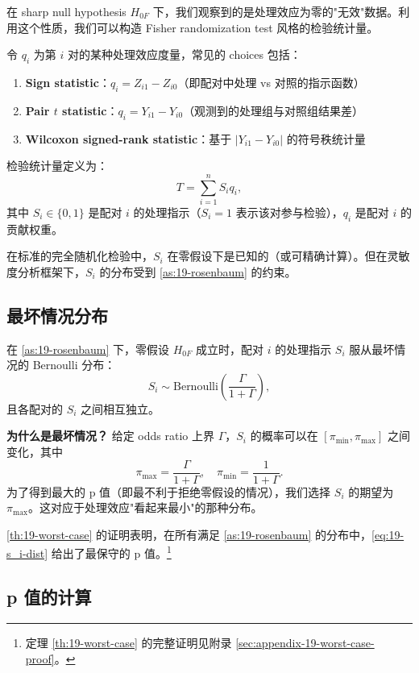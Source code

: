 在 sharp null hypothesis $H_{0F}$ 下，我们观察到的是处理效应为零的"无效"数据。利用这个性质，我们可以构造 Fisher randomization test 风格的检验统计量。

令 $q_i$ 为第 $i$ 对的某种处理效应度量，常见的 choices 包括：

\begin{enumerate}
  \item \textbf{Sign statistic}：$q_i = Z_{i1} - Z_{i0}$（即配对中处理 vs 对照的指示函数）
  \item \textbf{Pair $t$ statistic}：$q_i = Y_{i1} - Y_{i0}$（观测到的处理组与对照组结果差）
  \item \textbf{Wilcoxon signed-rank statistic}：基于 $|Y_{i1} - Y_{i0}|$ 的符号秩统计量
\end{enumerate}

检验统计量定义为：
\[
T = \sum_{i=1}^n S_i q_i,
\label{eq:19-test-stat}
\]
其中 $S_i \in \{0,1\}$ 是配对 $i$ 的处理指示（$S_i=1$ 表示该对参与检验），$q_i$ 是配对 $i$ 的贡献权重。

在标准的完全随机化检验中，$S_i$ 在零假设下是已知的（或可精确计算）。但在灵敏度分析框架下，$S_i$ 的分布受到 \cref{as:19-rosenbaum} 的约束。

\subsection{最坏情况分布}\label{sec:19-worst-case-dist}

\begin{Theorem}[最坏情况 p 值]\label{th:19-worst-case}
在 \cref{as:19-rosenbaum} 下，零假设 $H_{0F}$ 成立时，配对 $i$ 的处理指示 $S_i$ 服从最坏情况的 Bernoulli 分布：
\[
S_i \sim \text{Bernoulli}\left(\frac{\Gamma}{1+\Gamma}\right),
\label{eq:19-s_i-dist}
\]
且各配对的 $S_i$ 之间相互独立。
\end{Theorem}

\textbf{为什么是最坏情况？} 给定 odds ratio 上界 $\Gamma$，$S_i$ 的概率可以在 $[\pi_{\min}, \pi_{\max}]$ 之间变化，其中
\[
\pi_{\max} = \frac{\Gamma}{1+\Gamma}, \quad \pi_{\min} = \frac{1}{1+\Gamma}.
\]
为了得到最大的 p 值（即最不利于拒绝零假设的情况），我们选择 $S_i$ 的期望为 $\pi_{\max}$。这对应于处理效应"看起来最小"的那种分布。

\cref{th:19-worst-case} 的证明表明，在所有满足 \cref{as:19-rosenbaum} 的分布中，\cref{eq:19-s_i-dist} 给出了最保守的 p 值。\footnote{定理 \cref{th:19-worst-case} 的完整证明见附录 \cref{sec:appendix-19-worst-case-proof}。}

\subsection{p 值的计算}\label{sec:19-p-value}

